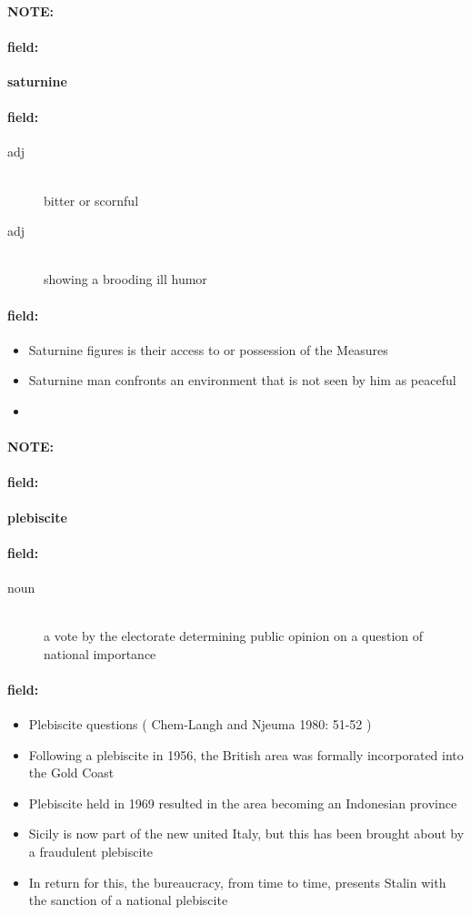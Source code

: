 \documentclass[12pt]{article}
\newenvironment{note}{\paragraph{NOTE:}}{}
\newenvironment{field}{\paragraph{field:}}{}
\begin{document}
\begin{note}
\begin{field}
\textbf{\large saturnine}
\end{field}


\begin{field}
\begin{description}
\item[adj] \hfill \\ 
bitter or scornful

\item[adj] \hfill \\ 
showing a brooding ill humor

\end{description}
\end{field}

\begin{field}
\begin{itemize}
\item Saturnine figures is their access to or possession of the Measures 
\item Saturnine man confronts an environment that is not seen by him as peaceful
\item 
\end{itemize}
\end{field}
\end{note}
\begin{note}
\begin{field}
\textbf{\large plebiscite}
\end{field}


\begin{field}
\begin{description}
\item[noun] \hfill \\ 
a vote by the electorate determining public opinion on a question of national importance

\end{description}
\end{field}

\begin{field}
\begin{itemize}
\item Plebiscite questions ( Chem-Langh and Njeuma 1980: 51-52 )
\item Following a plebiscite in 1956, the British area was formally incorporated into the Gold Coast
\item Plebiscite held in 1969 resulted in the area becoming an Indonesian province
\item Sicily is now part of the new united Italy, but this has been brought about by a fraudulent plebiscite
\item In return for this, the bureaucracy, from time to time, presents Stalin with the sanction of a national plebiscite
\end{itemize}
\end{field}
\end{note}
\end{document}
